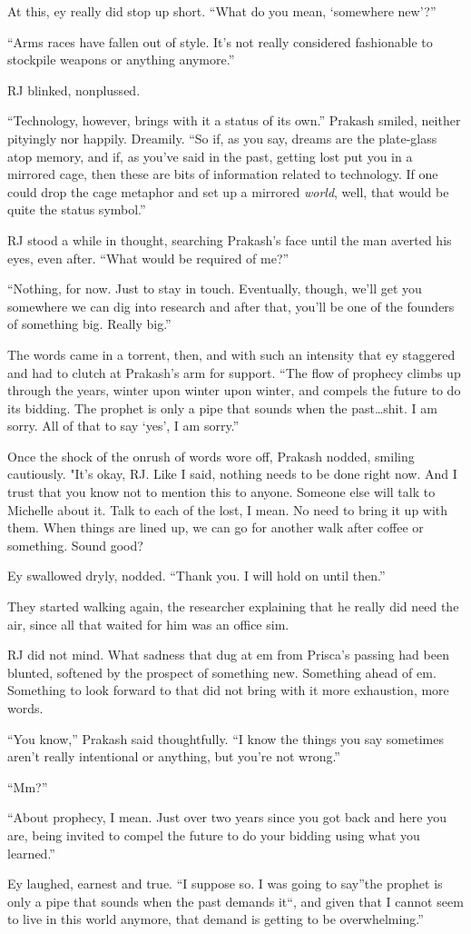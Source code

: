 At this, ey really did stop up short. ``What do you mean, `somewhere new'?''

``Arms races have fallen out of style. It's not really considered fashionable to stockpile weapons or anything anymore.''

RJ blinked, nonplussed.

``Technology, however, brings with it a status of its own.'' Prakash smiled, neither pityingly nor happily. Dreamily. ``So if, as you say, dreams are the plate-glass atop memory, and if, as you've said in the past, getting lost put you in a mirrored cage, then these are bits of information related to technology. If one could drop the cage metaphor and set up a mirrored \emph{world}, well, that would be quite the status symbol.''

RJ stood a while in thought, searching Prakash's face until the man averted his eyes, even after. ``What would be required of me?''

``Nothing, for now. Just to stay in touch. Eventually, though, we'll get you somewhere we can dig into research and after that, you'll be one of the founders of something big. Really big.''

The words came in a torrent, then, and with such an intensity that ey staggered and had to clutch at Prakash's arm for support. ``The flow of prophecy climbs up through the years, winter upon winter upon winter, and compels the future to do its bidding. The prophet is only a pipe that sounds when the past\ldots shit. I am sorry. All of that to say `yes', I am sorry.''

Once the shock of the onrush of words wore off, Prakash nodded, smiling cautiously. "It's okay, RJ. Like I said, nothing needs to be done right now. And I trust that you know not to mention this to anyone. Someone else will talk to Michelle about it. Talk to each of the lost, I mean. No need to bring it up with them. When things are lined up, we can go for another walk after coffee or something. Sound good?

Ey swallowed dryly, nodded. ``Thank you. I will hold on until then.''

They started walking again, the researcher explaining that he really did need the air, since all that waited for him was an office sim.

RJ did not mind. What sadness that dug at em from Prisca's passing had been blunted, softened by the prospect of something new. Something ahead of em. Something to look forward to that did not bring with it more exhaustion, more words.

``You know,'' Prakash said thoughtfully. ``I know the things you say sometimes aren't really intentional or anything, but you're not wrong.''

``Mm?''

``About prophecy, I mean. Just over two years since you got back and here you are, being invited to compel the future to do your bidding using what you learned.''

Ey laughed, earnest and true. ``I suppose so. I was going to say''the prophet is only a pipe that sounds when the past demands it``, and given that I cannot seem to live in this world anymore, that demand is getting to be overwhelming.''
